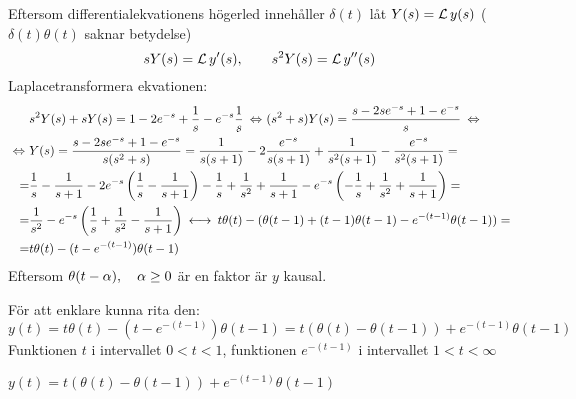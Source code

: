 \pagebreak
\begin{task}{5.11}
	Eftersom differentialekvationens högerled innehåller $\delta(t)$ låt $Y(s)=\operatorname{\mathcal{L}} y(s)$ ($\delta(t)\theta(t)$ saknar betydelse)
	\[sY(s)=\operatorname{\mathcal{L}} y'(s),\qquad s^2Y(s)=\operatorname{\mathcal{L}} y''(s)\]
	Laplacetransformera ekvationen:
	\begin{align*}
	&s^2Y(s)+sY(s)=1-2e^{-s}+\frac{1}{s}-e^{-s}\frac{1}{s} \lra
	(s^2+s)Y(s)=\frac{s-2se^{-s}+1-e^{-s}}{s}\lra \\ \lra
	&Y(s)=\frac{s-2se^{-s}+1-e^{-s}}{s(s^2+s)}=
	\frac{1}{s(s+1)}-2\frac{e^{-s}}{s(s+1)}+\frac{1}{s^2(s+1)}-\frac{e^{-s}}{s^2(s+1)}= \\ =
	&\frac{1}{s}-\frac{1}{s+1}-2e^{-s}\left(\frac{1}{s}-\frac{1}{s+1}\right)-\frac{1}{s}+\frac{1}{s^2}+\frac{1}{s+1}-e^{-s}\left(-\frac{1}{s}+\frac{1}{s^2}+\frac{1}{s+1}\right)= \\ =
	&\frac{1}{s^2}-e^{-s}\left(\frac{1}{s}+\frac{1}{s^2}-\frac{1}{s+1}\right) \llra
	t\theta(t)-(\theta(t-1)+(t-1)\theta(t-1)-e^{-(t-1)}\theta(t-1))= \\ =
	&t\theta(t)-(t-e^{-(t-1)})\theta(t-1)
	\end{align*}
	Eftersom $\theta(t-\alpha), \quad \alpha \ge 0$ är en faktor är $y$ kausal.
	
	För att enklare kunna rita den:
	\[y(t)=t\theta(t)-(t-e^{-(t-1)})\theta(t-1)=t(\theta(t)-\theta(t-1))+e^{-(t-1)}\theta(t-1)\]
	Funktionen $t$ i intervallet $0<t<1$, funktionen $e^{-(t-1)}$ i intervallet $1<t<\infty$
	
	\ans $y(t)=t(\theta(t)-\theta(t-1))+e^{-(t-1)}\theta(t-1)$
\end{task}

